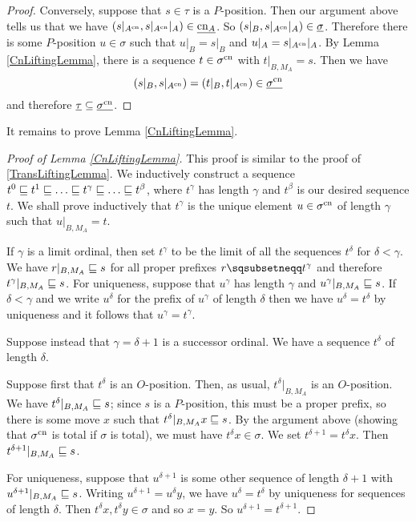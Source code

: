 \documentclass[11pt]{article} %
\begin{document}
\begin{proof}
  Conversely, suppose that $s\in\tau$ is a $P$-position.  Then our argument above tells us that we have $(s\vert_{A^{\operatorname{cn}}},s\vert_{A^{\operatorname{cn}}}\vert_A)\in\underline{\operatorname{cn}_A}$.  So $(s\vert_B,s\vert_{A^{\operatorname{cn}}}\vert_A)\in\underline{\sigma}$.  Therefore there is some $P$-position $u\in\sigma$ such that $u\vert_B=s\vert_B$ and $u\vert_A=s\vert_{A^{\operatorname{cn}}}\vert_A$.  By Lemma \ref{CnLiftingLemma}, there is a sequence $t\in\sigma^{\operatorname{cn}}$ with $t\vert_{B,M_A}=s$.  Then we have
  \[
    (s\vert_B,s\vert_{A^{\operatorname{cn}}})=(t\vert_B,t\vert_{A^{\operatorname{cn}}})\in\underline{\sigma^{\operatorname{cn}}}
    \]
  and therefore $\underline{\tau}\subseteq\underline{\sigma^{\operatorname{cn}}}$.  
\end{proof}

It remains to prove Lemma \ref{CnLiftingLemma}.  

\begin{proof}[Proof of Lemma \ref{CnLiftingLemma}]
  This proof is similar to the proof of \ref{TransLiftingLemma}.  We inductively construct a sequence $t^0\prefix t^1\prefix\dots\prefix t^\gamma\prefix\dots\prefix t^\beta$, where $t^\gamma$ has length $\gamma$ and $t^\beta$ is our desired sequence $t$.  We shall prove inductively that $t^\gamma$ is the unique element $u\in\sigma^{\operatorname{cn}}$ of length $\gamma$ such that $u\vert_{B,M_A}=t$.

  If $\gamma$ is a limit ordinal, then set $t^\gamma$ to be the limit of all the sequences $t^\delta$ for $\delta<\gamma$.  We have $r\vert_{B,M_A}\sqsubseteq s$ for all proper prefixes $r\pprefix t^{\gamma}$ and therefore $t^\gamma\vert_{B,M_A}\sqsubseteq s$.  For uniqueness, suppose that $u^\gamma$ has length $\gamma$ and $u^\gamma\vert_{B,M_A}\sqsubseteq s$.  If $\delta<\gamma$ and we write $u^\delta$ for the prefix of $u^\gamma$ of length $\delta$ then we have $u^\delta=t^\delta$ by uniqueness and it follows that $u^\gamma=t^\gamma$.

  Suppose instead that $\gamma=\delta+1$ is a successor ordinal.  We have a sequence $t^\delta$ of length $\delta$.  

  Suppose first that $t^\delta$ is an $O$-position.  Then, as usual, $t^\delta\vert_{B,M_A}$ is an $O$-position.  We have $t^\delta\vert_{B,M_A}\sqsubseteq s$; since $s$ is a $P$-position, this must be a proper prefix, so there is some move $x$ such that $t^\delta\vert_{B,M_A}x\sqsubseteq s$.  By the argument above (showing that $\sigma^{\operatorname{cn}}$ is total if $\sigma$ is total), we must have $t^\delta x\in\sigma$.  We set $t^{\delta+1}=t^\delta x$.  Then $t^{\delta+1}\vert_{B,M_A}\sqsubseteq s$.  

  For uniqueness, suppose that $u^{\delta+1}$ is some other sequence of length $\delta+1$ with $u^{\delta+1}\vert_{B,M_A}\sqsubseteq s$.  Writing $u^{\delta+1}=u^\delta y$, we have $u^{\delta}=t^\delta$ by uniqueness for sequences of length $\delta$.  Then $t^\delta x,t^\delta y\in\sigma$ and so $x=y$.  So $u^{\delta+1}=t^{\delta+1}$.  


\end{proof}
\end{document}
